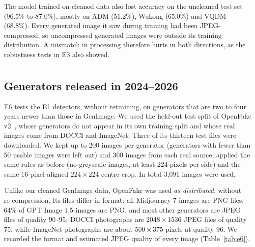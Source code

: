 \documentclass{mnnit}
\begin{document}
The model trained on cleaned data also lost accuracy on the uncleaned
test set (96.5\% to 87.0\%), mostly on ADM (51.2\%), Wukong (65.0\%) and
VQDM (68.8\%). Every generated image it saw during training had been
JPEG-compressed, so uncompressed generated images were outside its
training distribution. A mismatch in processing therefore hurts in
both directions, as the robustness tests in E3 also showed.

\section[Newer Generators and WhatsApp Sharing (E6)]{}
\label{sec:e6}
\subsection*{Generators released in 2024--2026}
E6 tests the E1 detectors, without retraining, on generators that are
two to four years newer than those in GenImage. We used the held-out
test split of OpenFake v2~\cite{livernoche2025openfake}, whose generators
do not appear in its own training split and whose real images come from
DOCCI and ImageNet. Three of its thirteen test files were downloaded. We
kept up to 200 images per generator (generators with fewer than 50
usable images were left out) and 300 images from each real source,
applied the same rules as before (no greyscale images, at least 224
pixels per side) and the same 16-pixel-aligned $224\times224$ centre
crop. In total 3{,}091 images were used.

Unlike our cleaned GenImage data, OpenFake was used \emph{as
distributed}, without re-compression. Its files differ in format: all
Midjourney 7 images are PNG files, 64\% of GPT Image 1.5 images are PNG,
and most other generators are JPEG files of quality 90--95. DOCCI
photographs are $2048\times1536$ JPEG files of quality 75, while ImageNet
photographs are about $500\times375$ pixels at quality 96. We recorded
the format and estimated JPEG quality of every image
(Table~\ref{tab:e6}).
\end{document}
